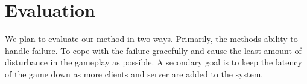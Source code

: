 

\section{Evaluation}
\label{sec:evaluation}

We plan to evaluate our method in two ways. Primarily, the methods ability to handle failure. To cope with the failure gracefully and cause the least amount of disturbance in the gameplay as possible. A secondary goal is to keep the latency of the game down as more clients and server are added to the system.

